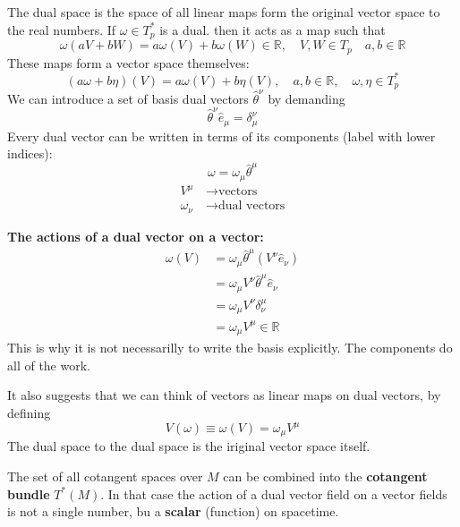 The dual space is the space of all linear maps form the original vector space to the real numbers. If $\omega\in T_p^*$ is a dual. then it acts as a map such that
\begin{equation*}
    \omega(aV+bW)=a\omega(V)+b\omega(W)\in\mathbb{R},\quad V,W\in T_p\quad  a,b\in \mathbb{R}
\end{equation*}
These maps form a vector space themselves:
\begin{equation*}
    (a\omega +b\eta)(V)=a\omega(V)+b\eta(V),\quad a,b\in\mathbb{R},\quad \omega,\eta\in T_p^*
\end{equation*}
We can introduce a set of basis dual vectors $\hat{\theta}^\nu$ by demanding 
\begin{equation*}
    \hat{\theta}^\nu\hat{e}_\mu=\delta^\nu_\mu
\end{equation*}
Every dual vector can be written in terms of its components (label with lower indices):
\begin{equation*}
    \omega =\omega_\mu\hat{\theta}^\mu
\end{equation*}
\begin{align*}
    V^\mu& \, \to \text{vectors}\\
    \omega_\nu& \, \to \text{dual vectors}
\end{align*}
\begin{tcolorbox}
    \textbf{The actions of a dual vector on a vector:}
    \begin{align*}
        \omega(V)&=\omega_\mu\hat{\theta}^\mu(V^\nu\hat{e}_\nu)\\
        &=\omega_\mu V^\nu \hat{\theta}^\mu\hat{e}_\nu\\
        &=\omega_\mu V^\nu\delta^\mu_\nu\\
        &=\omega_\mu V^\mu \in\mathbb{R}
    \end{align*}
    This is why it is not necessarilly to write the basis explicitly. The components do all of the work.
\end{tcolorbox}
It also suggests that we can think of vectors as linear maps on dual vectors, by defining
\begin{equation*}
    V(\omega)\equiv \omega(V)=\omega_\mu V^\mu
\end{equation*}
The dual space to the dual space is the iriginal vector space itself.

The set of all cotangent spaces over $M$ can be combined into the \textbf{cotangent bundle} $T^*(M)$. In that case the action of a dual vector field on a vector fields is not a single number, bu a \textbf{scalar} (function) on spacetime.

